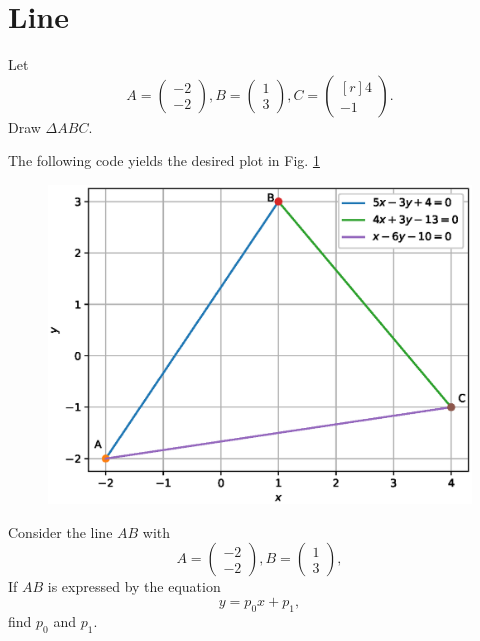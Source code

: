 \documentclass[journal,12pt,twocolumn]{IEEEtran}
\begin{document}
\section{Line}
\begin{problem}
\label{prob:draw_triangle}
Let
\begin{equation}
A =
\begin{pmatrix}
-2
\\
-2
\end{pmatrix},
B =
\begin{pmatrix}
1
\\
3
\end{pmatrix},
C =
\begin{pmatrix*}[r]
4
\\
-1
\end{pmatrix*}.
\end{equation}
Draw $\Delta ABC$.
\end{problem}
\solution
The following code yields the desired plot in Fig. \ref{fig:triangle_def}

\begin{figure}
\centering
\includegraphics[width=\columnwidth]{./figs/triangle.eps}
\caption{}
\label{fig:triangle_def}
\end{figure}
%
\begin{problem}
\label{prob:line_eq}
Consider the line $AB$ with 
\begin{equation}
A =
\begin{pmatrix}
-2
\\
-2
\end{pmatrix},
B =
\begin{pmatrix}
1
\\
3
\end{pmatrix},
\end{equation}
%
If $AB$ is expressed by the equation
\begin{equation}
y = p_0x + p_1, 
\end{equation}
find $p_0$ and $p_1$.
\end{problem}
\end{document}

